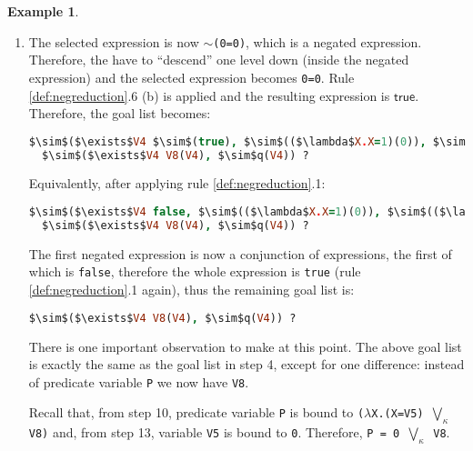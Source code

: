 \documentclass[inscr,ack,preface]{dithesis}
\theoremstyle{definition}
\newtheorem{example}{Example}[chapter]
\newcommand{\msf}[1]{$\mathsf{#1}$}
\begin{document}
\begin{example}
\begin{enumerate}
Furthermore, we reduce the first lambda expression of the completed expression:
\begin{lstlisting}[language=Prolog,%
  frame=single,breaklines=false,mathescape=true]
  $\sim$($\exists$V4 $\sim$(0=0), $\sim$(($\lambda$X.X=1)(0)), $\sim$(($\lambda$X.X=2)(0))),
  $\sim$($\exists$V4 V8(V4), $\sim$q(V4)) ?
\end{lstlisting}

\item The selected expression is now \texttt{$\sim$(0=0)}, which is a negated expression. Therefore, the have to ``descend'' one level down (inside the negated expression) and the selected expression becomes \texttt{0=0}. Rule \ref{def:negreduction}.6 (b) is applied and the resulting expression is \msf{true}. Therefore, the goal list becomes:
\begin{lstlisting}[language=Prolog,%
  frame=single,breaklines=false,mathescape=true]
  $\sim$($\exists$V4 $\sim$(true), $\sim$(($\lambda$X.X=1)(0)), $\sim$(($\lambda$X.X=2)(0))),
  $\sim$($\exists$V4 V8(V4), $\sim$q(V4)) ?
\end{lstlisting}

Equivalently, after applying rule \ref{def:negreduction}.1:
\begin{lstlisting}[language=Prolog,%
  frame=single,breaklines=false,mathescape=true]
  $\sim$($\exists$V4 false, $\sim$(($\lambda$X.X=1)(0)), $\sim$(($\lambda$X.X=2)(0))),
  $\sim$($\exists$V4 V8(V4), $\sim$q(V4)) ?
\end{lstlisting}

The first negated expression is now a conjunction of expressions, the first of which is \texttt{false}, therefore the whole expression is \texttt{true} (rule \ref{def:negreduction}.1 again), thus the remaining goal list is:
\begin{lstlisting}[language=Prolog,%
  frame=single,breaklines=false,mathescape=true]
  $\sim$($\exists$V4 V8(V4), $\sim$q(V4)) ?
\end{lstlisting}

There is one important observation to make at this point. The above goal list is exactly the same as the goal list in step 4, except for one difference: instead of predicate variable \texttt{P} we now have \texttt{V8}.

Recall that, from step 10, predicate variable \texttt{P} is bound to \texttt{($\lambda$X.(X=V5) $\bigvee_{\kappa}$ V8)} and, from step 13, variable \texttt{V5} is bound to \texttt{0}. Therefore, \texttt{P = 0 $\bigvee_{\kappa}$ V8}.


\end{enumerate}
\end{example}
\end{document}
